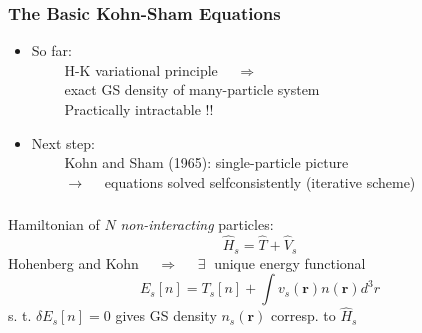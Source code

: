 \documentclass[compress]{beamer}
\begin{document}
\frame
{ 
  \frametitle{The Basic Kohn-Sham Equations}
  \begin{small}
    {\scriptsize
      \begin{itemize}
      \item So far: \\
        $\quad \quad $ H-K \alert{variational principle} $\quad \Longrightarrow \quad $ \\
        $\quad \quad $ exact GS density of many-particle system \\
        $\quad \quad $ \alert{Practically intractable !!}  
      \item Next step: \\
        $\quad \quad $ Kohn and Sham (1965): \alert{single-particle picture} \\
 $\quad \quad $ $\longrightarrow \quad $ equations solved \alert{selfconsistently} (iterative scheme) 
      \end{itemize}
    }
  \end{small}
}

\frame
{ 
  \frametitle{}
  \begin{small}
    {\scriptsize
      Hamiltonian of $N$ \emph{non-interacting} particles:
      \begin{equation}
        \hat{H}_{s}=\hat{T}+\hat{V}_{s} \nonumber
      \end{equation}
      Hohenberg and Kohn $\quad \Longrightarrow \quad $ $\exists \;$ unique energy functional 
      \begin{equation}
        E_{s}[n]=T_{s}[n]+\int v_{s}(\mathbf{r})n(\mathbf{r})d^{3}r \nonumber
      \end{equation}
      s. t. $\delta E_{s}[n]=0$ gives GS density $n_{s}(\mathbf{r})$ corresp. to $\hat{H}_{s}$


    }
  \end{small}
}
\end{document}
